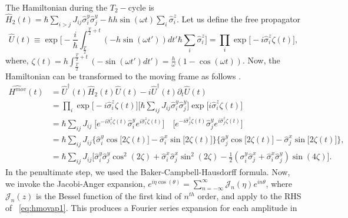 \documentclass[12pt]{iopart}
\providecommand{\DIFaddtex}[1]{{\protect\color{red}\uwave{#1}}} %
\providecommand{\DIFdeltex}[1]{{}}                      %
\providecommand{\DIFaddbegin}{} %
\providecommand{\DIFaddend}{} %
\providecommand{\DIFdelbegin}{} %
\providecommand{\DIFdelend}{} %
\providecommand{\DIFadd}[1]{\texorpdfstring{\DIFaddtex{#1}}{#1}} %
\providecommand{\DIFdel}[1]{\texorpdfstring{\DIFdeltex{#1}}{}} %
\newcommand{\DIFscaledelfig}{0.5}
\newlength{\DIFdelgraphicswidth} %
\newlength{\DIFdelgraphicsheight} %
\newcommand{\DIFaddincludegraphics}[2][]{{\color{blue}\fbox{\DIFOincludegraphics[#1]{#2}}}} %
\newcommand{\DIFdelincludegraphics}[2][]{%
\sbox{\DIFdelgraphicsbox}{\DIFOincludegraphics[#1]{#2}}%
\settoboxwidth{\DIFdelgraphicswidth}{\DIFdelgraphicsbox} %
\settoboxtotalheight{\DIFdelgraphicsheight}{\DIFdelgraphicsbox} %
\scalebox{\DIFscaledelfig}{%
\parbox[b]{\DIFdelgraphicswidth}{\usebox{\DIFdelgraphicsbox}\\[-\baselineskip] \rule{\DIFdelgraphicswidth}{0em}}\llap{\resizebox{\DIFdelgraphicswidth}{\DIFdelgraphicsheight}{%
\setlength{\unitlength}{\DIFdelgraphicswidth}%
\begin{picture}(1,1)%
\thicklines\linethickness{2pt} %
{\color[rgb]{1,0,0}\put(0,0){\framebox(1,1){}}}%
{\color[rgb]{1,0,0}\put(0,0){\line( 1,1){1}}}%
{\color[rgb]{1,0,0}\put(0,1){\line(1,-1){1}}}%
\end{picture}%
}\hspace*{3pt}}} %
} %
\DeclareRobustCommand{\DIFaddbegin}{\DIFOaddbegin \let\includegraphics\DIFaddincludegraphics} %
\DeclareRobustCommand{\DIFaddend}{\DIFOaddend \let\includegraphics\DIFOincludegraphics} %
\DeclareRobustCommand{\DIFdelbegin}{\DIFOdelbegin \let\includegraphics\DIFdelincludegraphics} %
\DeclareRobustCommand{\DIFdelend}{\DIFOaddend \let\includegraphics\DIFOincludegraphics} %
\begin{document}
The Hamiltonian during the $T_2-$cycle is $\displaystyle \hat{H}_2(t) = \hbar\sum_{i>j} J_{ij}\hat{\sigma}^y_i\hat{\sigma}^y_j - \hbar h \sin(\omega t) \sum_i \hat{\sigma}^z_i$. Let us define the free propagator 
\begin{equation}
    \hat{U}(t) \equiv \exp \bigg[-\frac{i}{\hbar}\int_{\frac{T}{2}}^{\frac{T}{2}+t} (-h \sin(\omega t'))dt' \hbar\sum_i\hat{\sigma}^z_i\bigg]
    =\prod_{i} \exp\big[-i \hat{\sigma}^z_i\zeta(t)\big],
\end{equation}
where, $\displaystyle \zeta (t) = h\int_{\frac{T}{2}}^{\frac{T}{2}+t}  (-\sin(\omega t')dt') =\frac{h}{\omega}(1-\cos(\omega t))$.
Now, the Hamiltonian can be transformed to the moving frame as follows \cite{haldar_statistical_2022}.
\begin{align}
    \hat{H^{mov}}(t) &= \hat{U}^\dagger(t) \hat{H}_2(t) \hat{U}(t)- i \hat{U}^\dagger(t) \partial_t \hat{U}(t) \nonumber\\
    &= \prod_{i} \exp\big[-i\hat{\sigma}^z_i \zeta(t)\big] \big[\hbar\sum_{ij}J_{ij}\hat{\sigma}^y_i\hat{\sigma}^y_j\big] \exp\big[ i\hat{\sigma}^z_i \zeta(t)\big]\nonumber\\
    &= \hbar\sum_{ij} J_{ij}\;\big[ e^{-i\hat{\sigma}^z_i \zeta(t)} \hat{\sigma}^y_i e^{i\hat{\sigma}^z_i \zeta(t)}\big]\quad \big[e^{-i\hat{\sigma}^z_j  \zeta(t)}\hat{\sigma}^y_j e^{i\hat{\sigma}^z_j \zeta(t)}\big]\nonumber\\
    &=\hbar\sum_{ij}J_{ij}\Big\{\hat{\sigma}^y_i\cos{\big[2\zeta(t)\big]}-\hat{\sigma}^x_i\sin{\big[2\zeta(t)\big]}\Big\}\Big\{\hat{\sigma}^y_j\cos{\big[2\zeta(t)\big]}-\hat{\sigma}^x_j\sin{\big[2\zeta(t)\big]}\Big\},\nonumber\\
    &= \hbar\sum_{ij} J_{ij}  \Big[ \hat{\sigma}^y_i\hat{\sigma}^y_j\cos^2(2\zeta) +\hat{\sigma}^x_i\hat{\sigma}^x_j \sin^2(2\zeta) - \frac{1}{2} (\sigma^y_i\hat{\sigma}^x_j + \hat{\sigma}^x_i\hat{\sigma}^y_j)\sin(4\zeta)\Big].
    \label{eq:hmovap1}
\end{align}
In the penultimate step, we used the Baker-Campbell-Hausdorff formula\DIFaddbegin \DIFadd{~\mbox{%
\cite{Magnus1954}}\hspace{0pt}%
}\DIFaddend . Now, we invoke the Jacobi-Anger expansion, $e^{i\eta \cos(\theta)} = \sum_{n=-\infty}^{\infty}\mathcal{J}_n(\eta)e^{in\theta}$, where $\mathcal{J}_n(z)$ is the Bessel function of the first kind of $n^{th}$ order, and apply to the RHS of  \DIFdelbegin \DIFdel{Eq.}\DIFdelend \DIFaddbegin \DIFadd{equation}\DIFaddend ~\ref{eq:hmovap1}. This produces a Fourier series expansion for each amplitude in
\end{document}
